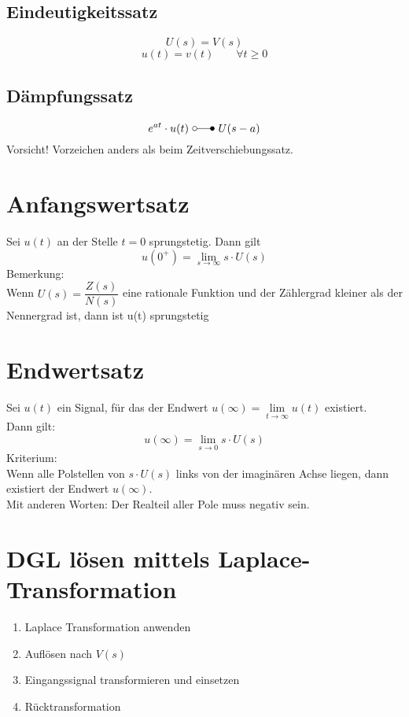\subsection{Eindeutigkeitssatz}
\[ 
    U(s) = V(s) 
\]
\[ 
    u(t) = v(t) \qquad \forall t \geq 0 
\]

\subsection{Dämpfungssatz}
\[ 
    e^{at} \cdot u(t) ~ \laplace ~ U(s - a) 
\]
Vorsicht! Vorzeichen anders als beim Zeitverschiebungssatz.



\section{Anfangswertsatz}
Sei $u(t)$ an der Stelle $t = 0$ sprungstetig. Dann gilt
\[ 
    u(0^+) = \lim\limits_{s \to \infty} s \cdot U(s) 
\]
Bemerkung: \\
Wenn $U(s) = \dfrac{Z(s)}{N(s)}$ eine rationale Funktion  und der Zählergrad 
kleiner als der Nennergrad ist, dann ist u(t) sprungstetig

\section{Endwertsatz}
Sei $u(t)$ ein Signal, für das der Endwert
$u(\infty) = \lim\limits_{t \to \infty} u(t)$ existiert. \\
Dann gilt:
\[ 
u(\infty) = \lim\limits_{s \to 0} s \cdot U(s) 
\]
Kriterium: \\
Wenn alle Polstellen von $s \cdot U(s)$ links von der imaginären Achse liegen,
dann existiert der Endwert $u(\infty)$. \\
Mit anderen Worten: Der Realteil aller Pole muss negativ sein.

\section{DGL lösen mittels Laplace-Transformation}
\begin{enumerate}
    \item Laplace Transformation anwenden
    \item Auflösen nach $V(s)$
    \item Eingangssignal transformieren und einsetzen
    \item Rücktransformation
\end{enumerate}

